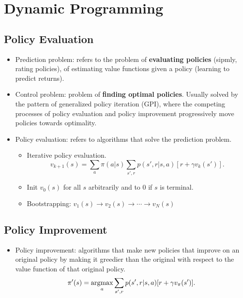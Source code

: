 \chapter{Dynamic Programming}

\section{Policy Evaluation}
\begin{itemize}
	\item Prediction problem: refers to the problem of \textbf{evaluating policies} (sipmly, rating policies), of estimating value functions given a policy (learning to predict returns).
	\item Control problem: problem of \textbf{finding optimal policies}. Usually solved by the pattern of generalized policy iteration (GPI), where the competing processes of policy evaluation and policy improvement progressively move policies towards optimality.
	\item Policy evaluation: refers to algorithms that solve the prediction problem.
		\begin{itemize}
			\item Iterative policy evaluation.
				$$v_{k+1}(s)=\sum_{a}\pi(a|s)\sum_{s',r}p(s',r|s,a)[r + \gamma v_k(s')].$$ 
			\item Init $v_0(s)$ for all $s$ arbitrarily and to 0 if $s$ is terminal. 
			\item Bootstrapping: $v_1(s)\to v_2(s)\to\cdots\to v_N(s)$
		\end{itemize}
\end{itemize}

\section{Policy Improvement}
\begin{itemize}
	\item Policy improvement: algorithms that make new policies that improve on an original policy by making it greedier than the original with respect to the value function of that original policy. 
		$$\pi'(s) = \operatorname*{\operatorname{argmax}}_a \sum_{s',r}p(s',r|s,a)[r + \gamma v_\pi(s')].$$
\end{itemize}
